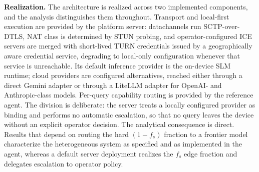 \documentclass[conference]{IEEEtran}
\newcommand{\fs}{f_{s}}
\begin{document}
\textbf{Realization.} The architecture is realized across two
implemented components, and the analysis distinguishes them throughout. Transport and
local-first execution are provided by the platform server: datachannels run
SCTP-over-DTLS, NAT class is determined by STUN probing, and
operator-configured ICE servers are merged with short-lived TURN credentials
issued by a geographically aware credential service, degrading to local-only
configuration whenever that service is unreachable. Its default inference
provider is the on-device SLM runtime; cloud providers are configured
alternatives, reached either through a direct Gemini adapter or through a
LiteLLM adapter for OpenAI- and Anthropic-class models. Per-query capability
routing is provided by the reference agent. The division is
deliberate: the server treats a locally configured provider as binding and
performs no automatic escalation, so that no query leaves the device without an
explicit operator decision. The analytical consequence is direct. Results that
depend on routing the hard $(1-\fs)$ fraction to a frontier model characterize
the heterogeneous system as specified and as implemented in the agent, whereas
a default server deployment realizes the $\fs$ edge fraction and delegates
escalation to operator policy.
\end{document}
